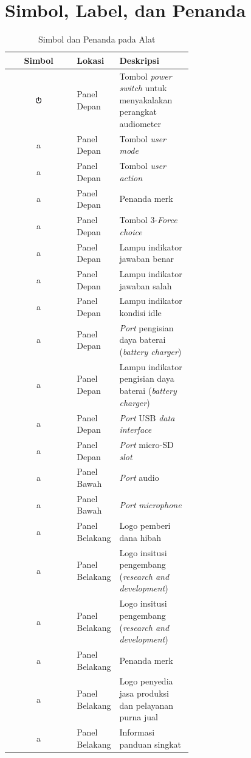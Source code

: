 \documentclass[11pt,a4paper,twoside,draft,onecolumn]{book}
\begin{document}
		\section{Simbol, Label, dan Penanda}
		\begin{table}
			\centering
			\caption{Simbol dan Penanda pada Alat}
			\label{tab:2.2}
			\begin{tabular}{| c | p{0.2\linewidth}| p{0.4\linewidth}|}
				\hline
				Simbol & Lokasi & Deskripsi\\
				\hline
				\hline
				\includegraphics[width=0.1\textwidth]{images/powerswitch} & Panel Depan & Tombol \emph{power switch} untuk menyakalakan perangkat audiometer\\
				\hline
				a & Panel Depan & Tombol \emph{user mode}\\
				\hline
				a & Panel Depan & Tombol \emph{user action}\\
				\hline
				a & Panel Depan & Penanda merk\\
				\hline
				a & Panel Depan & Tombol 3-\emph{Force choice}\\
				\hline
				a & Panel Depan & Lampu indikator jawaban benar\\
				\hline
				a & Panel Depan & Lampu indikator jawaban salah\\
				\hline
				a & Panel Depan & Lampu indikator kondisi idle\\
				\hline
				a & Panel Depan & \emph{Port} pengisian daya baterai (\emph{battery charger})\\
				\hline
				a & Panel Depan & Lampu indikator pengisian daya baterai (\emph{battery charger})\\
				\hline
				a & Panel Depan & \emph{Port} USB \emph{data interface}\\
				\hline
				a & Panel Depan & \emph{Port} micro-SD \emph{slot}\\
				\hline
				a & Panel Bawah & \emph{Port} audio\\
				\hline
				a & Panel Bawah & \emph{Port} \emph{microphone}\\
				\hline
				a & Panel Belakang & Logo pemberi dana hibah\\
				\hline
				a & Panel Belakang & Logo insitusi pengembang (\emph{research and development})\\
				\hline
				a & Panel Belakang & Logo insitusi pengembang (\emph{research and development})\\
				\hline
				a & Panel Belakang & Penanda merk\\
				\hline
				a & Panel Belakang & Logo penyedia jasa produksi dan pelayanan purna jual\\
				\hline
				a & Panel Belakang & Informasi panduan singkat\\
				\hline
			\end{tabular}
		\end{table}
		
\end{document}
